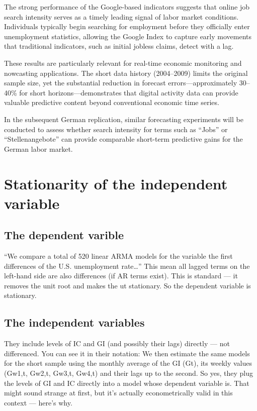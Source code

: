 \documentclass{article}
\begin{document}
The strong performance of the Google-based indicators suggests that online job search intensity serves as a timely leading signal of labor market conditions. 
Individuals typically begin searching for employment before they officially enter unemployment statistics, allowing the Google Index to capture early movements that traditional indicators, such as initial jobless claims, detect with a lag.

These results are particularly relevant for real-time economic monitoring and nowcasting applications. 
The short data history (2004–2009) limits the original sample size, yet the substantial reduction in forecast errors---approximately 30–40\% for short horizons---demonstrates that digital activity data can provide valuable predictive content beyond conventional economic time series.

In the subsequent German replication, similar forecasting experiments will be conducted to assess whether search intensity for terms such as ``Jobs'' or ``Stellenangebote'' can provide comparable short-term predictive gains for the German labor market.

\section{Stationarity of the independent variable}
\subsection{The dependent varible}
“We compare a total of 520 linear ARMA models for the variable the first differences of the U.S. unemployment rate…” This mean all lagged terms on the left-hand side are also differences (if AR terms exist).
This is standard — it removes the unit root and makes the ut stationary. So the dependent variable is stationary.

\subsection{The independent variables}
They include levels of IC and GI (and possibly their lags) directly — not differenced.
You can see it in their notation:
We then estimate the same models for the short sample using the monthly average of the GI (Gt), its weekly values (Gw1,t, Gw2,t, Gw3,t, Gw4,t) and their lags up to the second.
So yes, they plug the levels of GI and IC directly into a model whose dependent variable is.
That might sound strange at first, but it’s actually econometrically valid in this context — here’s why.
\end{document}
